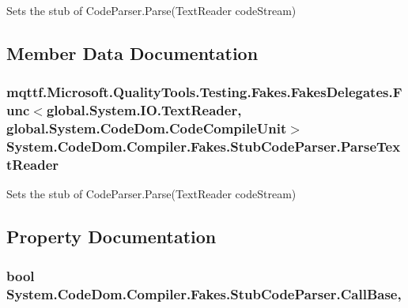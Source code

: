 Sets the stub of Code\-Parser.\-Parse(\-Text\-Reader code\-Stream)



\subsection{Member Data Documentation}
\hypertarget{class_system_1_1_code_dom_1_1_compiler_1_1_fakes_1_1_stub_code_parser_a9bff71275c6eaca67f9fd7c1ed570bb1}{
\subsubsection[{Parse\-Text\-Reader}]{\setlength{\rightskip}{0pt plus 5cm}mqttf.\-Microsoft.\-Quality\-Tools.\-Testing.\-Fakes.\-Fakes\-Delegates.\-Func$<$global.\-System.\-I\-O.\-Text\-Reader, global.\-System.\-Code\-Dom.\-Code\-Compile\-Unit$>$ System.\-Code\-Dom.\-Compiler.\-Fakes.\-Stub\-Code\-Parser.\-Parse\-Text\-Reader}}\label{class_system_1_1_code_dom_1_1_compiler_1_1_fakes_1_1_stub_code_parser_a9bff71275c6eaca67f9fd7c1ed570bb1}


Sets the stub of Code\-Parser.\-Parse(\-Text\-Reader code\-Stream)



\subsection{Property Documentation}
\hypertarget{class_system_1_1_code_dom_1_1_compiler_1_1_fakes_1_1_stub_code_parser_a0472b35488d3b3d3a89cc650155e52b8}{
\subsubsection[{Call\-Base}]{\setlength{\rightskip}{0pt plus 5cm}bool System.\-Code\-Dom.\-Compiler.\-Fakes.\-Stub\-Code\-Parser.\-Call\-Base\hspace{0.3cm}{\ttfamily [get]}, {\ttfamily [set]}}}\label{class_system_1_1_code_dom_1_1_compiler_1_1_fakes_1_1_stub_code_parser_a0472b35488d3b3d3a89cc650155e52b8}



